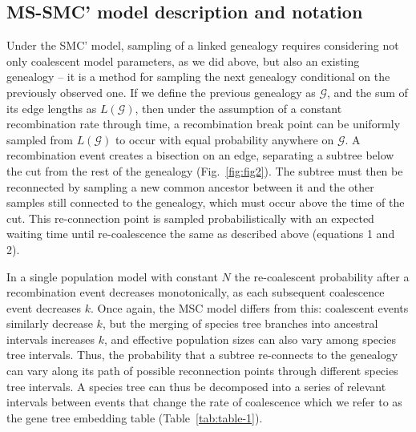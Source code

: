 \documentclass[11pt]{article}
\begin{document}

\subsection{MS-SMC' model description and notation}

Under the SMC' model, sampling of a linked genealogy requires considering not only 
coalescent model parameters, 
as we did above, but also an existing genealogy -- it is a method 
for sampling the next genealogy conditional on the previously observed one. 
If we define the previous genealogy as $\mathcal{G}$, and the sum of its edge lengths 
as $L(\mathcal{G})$, then under the assumption of a constant recombination rate through time,
a recombination break point can be uniformly sampled from $L(\mathcal{G})$ to occur with 
equal probability anywhere on $\mathcal{G}$. A recombination event creates 
a bisection on an edge, separating a subtree below the cut from the rest of 
the genealogy (Fig.~\ref{fig:fig2}). The subtree must then be reconnected by sampling a new common 
ancestor between it and the other samples still connected to the genealogy, which 
must occur above the time of the cut. This re-connection point is sampled 
probabilistically with an expected waiting time until re-coalescence the 
same as described above (equations 1 and 2).

In a single population model with constant $N$ the re-coalescent probability
after a recombination event decreases monotonically, as each subsequent 
coalescence event decreases $k$.
Once again, the MSC model 
differs from this: coalescent events similarly decrease $k$, but the merging of 
species tree branches into ancestral intervals increases $k$, and effective population 
sizes can also vary among species tree intervals. 
Thus, the probability that a subtree re-connects to the genealogy can vary 
along its path of possible reconnection points through 
different species tree intervals.
A species tree can thus be decomposed into a series of relevant intervals 
between events that change the rate of coalescence
which we refer to as the gene tree embedding 
table (Table~\ref{tab:table-1}). 
\end{document}
